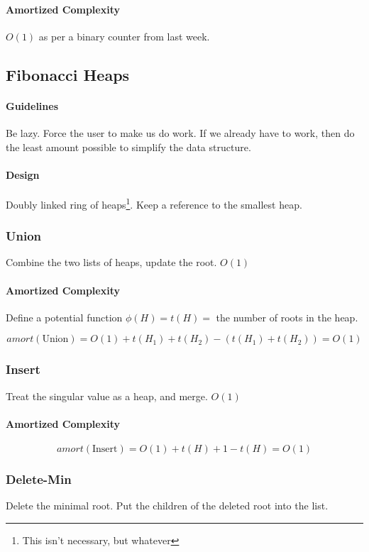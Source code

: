 \documentclass[a4paper]{article}
\begin{document}
\paragraph{Amortized Complexity}
$O(1)$ as per a binary counter from last week.


\subsection{Fibonacci Heaps}

\paragraph{Guidelines}
Be lazy. Force the user to make us do work. If we already have to work, then do the least amount possible to simplify the data structure.

\paragraph{Design}
Doubly linked ring of heaps\footnote{This isn't necessary, but whatever}. Keep a reference to the smallest heap.

\subsubsection{Union}
Combine the two lists of heaps, update the root. $O(1)$

\paragraph{Amortized Complexity}
Define a potential function $\phi(H)=t(H)=$ the number of roots in the heap.

\[amort(\text{Union})=O(1)+t(H_1)+t(H_2)-(t(H_1)+t(H_2))=O(1)\]

\subsubsection{Insert}
Treat the singular value as a heap, and merge. $O(1)$

\paragraph{Amortized Complexity}
\[amort(\text{Insert})=O(1)+t(H)+1-t(H)=O(1)\]

\subsubsection{Delete-Min}
Delete the minimal root. Put the children of the deleted root into the list.
\end{document}

